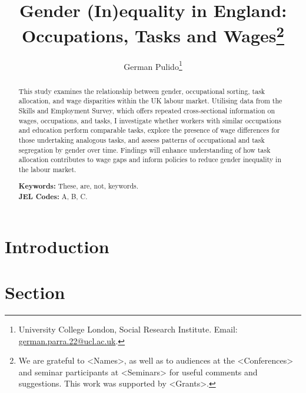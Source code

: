 \documentclass[12pt]{article}
\begin{document}
\title{Gender (In)equality in England: Occupations, Tasks and Wages\thanks{
We are grateful to <Names>, as well as to audiences at the <Conferences> and seminar participants at <Seminars> for useful comments and suggestions. 
This work was supported by <Grants>.
}}

\author{German Pulido\thanks{University College London, Social Research Institute. Email: \href{mailto:german.parra.22@ucl.ac.uk}{german.parra.22@ucl.ac.uk}.}}

\begin{titlepage}
\maketitle

\begin{abstract}
\noindent This study examines the relationship between gender, occupational sorting, task allocation, and wage disparities within the UK labour market. Utilising data from the Skills and Employment Survey, which offers repeated cross‐sectional information on wages, occupations, and tasks, I investigate whether workers with similar occupations and education perform comparable tasks, explore the presence of wage differences for those undertaking analogous tasks, and assess patterns of occupational and task segregation by gender over time. Findings will enhance understanding of how task allocation contributes to wage gaps and inform policies to reduce gender inequality in the labour market.

\vspace{1em}
\noindent\textbf{Keywords:} These, are, not, keywords.\\
\noindent\textbf{JEL Codes:} A, B, C.
\end{abstract}

\setcounter{page}{0}
\thispagestyle{empty}
\end{titlepage}

\pagebreak

\onehalfspacing %

\section{Introduction}\label{sec:introduction}


\section{Section} \label{sec:section}

\end{document}
